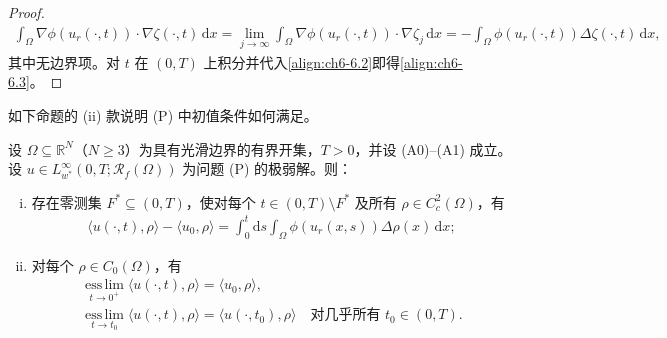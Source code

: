 \documentclass[../../main.tex]{subfiles}%
\begin{document}
\begin{proof}
\begin{align*}
\int_\Omega\nabla\phi(u_r(\cdot,t))\cdot\nabla\zeta(\cdot,t)\,\mathrm{d}x
=\lim_{j\to\infty}\int_\Omega\nabla\phi(u_r(\cdot,t))\cdot\nabla\zeta_j\,\mathrm{d}x
=-\int_\Omega\phi(u_r(\cdot,t))\Delta\zeta(\cdot,t)\,\mathrm{d}x,
\end{align*}
其中无边界项。对 $t$ 在 $(0,T)$ 上积分并代入\eqref{align:ch6-6.2}即得\eqref{align:ch6-6.3}。
\end{proof}

如下命题的 (ii) 款说明 (P) 中初值条件如何满足。

\begin{proposition}\label{proposition:ch06-6.1.1}\label{proposition:ch6-1.1}
设 $\Omega\subseteq\mathbb{R}^N$（$N\geqslant3$）为具有光滑边界的有界开集，$T>0$，并设 (A0)--(A1) 成立。设 $u\in L^\infty_{w^*}(0,T;\mathscr{R}_f(\Omega))$ 为问题 (P) 的极弱解。则：
\begin{enumerate}[(i)]
\item 存在零测集 $F^*\subseteq(0,T)$，使对每个 $t\in(0,T)\setminus F^*$ 及所有 $\rho\in C^2_c(\Omega)$，有
\begin{align}
\langle u(\cdot,t),\rho\rangle-\langle u_0,\rho\rangle
= \int_0^t\mathrm{d}s\int_\Omega\phi(u_r(x,s))\Delta\rho(x)\,\mathrm{d}x; \label{align:ch6-6.4}
\end{align}
\item 对每个 $\rho\in C_0(\Omega)$，有
\begin{align}
\operatorname*{ess\,lim}_{t\to0^+}\langle u(\cdot,t),\rho\rangle=\langle u_0,\rho\rangle, \label{align:ch6-6.5a}\\
\operatorname*{ess\,lim}_{t\to t_0}\langle u(\cdot,t),\rho\rangle=\langle u(\cdot,t_0),\rho\rangle
\quad\text{对几乎所有 }t_0\in(0,T). \label{align:ch6-6.5b}
\end{align}
\end{enumerate}
\end{proposition}
\end{document}
